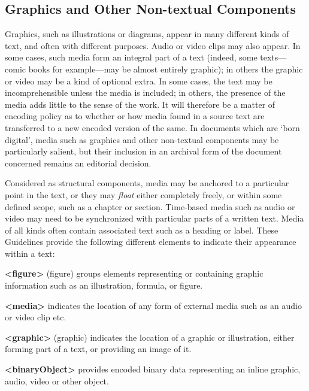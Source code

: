\subsection[{Graphics and Other Non-textual Components}]{Graphics and Other Non-textual Components}\label{COGR}\par
Graphics, such as illustrations or diagrams, appear in many different kinds of text, and often with different purposes. Audio or video clips may also appear. In some cases, such media form an integral part of a text (indeed, some texts—comic books for example—may be almost entirely graphic); in others the graphic or video may be a kind of optional extra. In some cases, the text may be incomprehensible unless the media is included; in others, the presence of the media adds little to the sense of the work. It will therefore be a matter of encoding policy as to whether or how media found in a source text are transferred to a new encoded version of the same. In documents which are ‘born digital’, media such as graphics and other non-textual components may be particularly salient, but their inclusion in an archival form of the document concerned remains an editorial decision.\par
Considered as structural components, media may be anchored to a particular point in the text, or they may \textit{float} either completely freely, or within some defined scope, such as a chapter or section. Time-based media such as audio or video may need to be synchronized with particular parts of a written text. Media of all kinds often contain associated text such as a heading or label. These Guidelines provide the following different elements to indicate their appearance within a text: 
\begin{sansreflist}
  
\item [\textbf{<figure>}] (figure) groups elements representing or containing graphic information such as an illustration, formula, or figure.
\item [\textbf{<media>}] indicates the location of any form of external media such as an audio or video clip etc.
\item [\textbf{<graphic>}] (graphic) indicates the location of a graphic or illustration, either forming part of a text, or providing an image of it.
\item [\textbf{<binaryObject>}] provides encoded binary data representing an inline graphic, audio, video or other object.
\end{sansreflist}
\par
